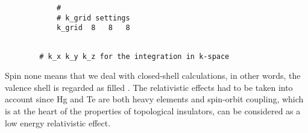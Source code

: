 	\begin{minipage}[c]{0.3\linewidth}\vspace{0.2cm}
		\begin{verbatim}
			#
			# k_grid settings
			k_grid	8	8	8
		\end{verbatim}\vspace{8pt}
	\end{minipage}
	\hfill 
	\begin{minipage}[c]{0.7\linewidth}\vspace{28pt}
		\begin{verbatim}
		
		# k_x k_y k_z for the integration in k-space
		\end{verbatim}\vspace{8pt}
	\end{minipage} 

	Spin none means that we deal with closed-shell calculations, in other words, the valence shell is regarded as filled \cite{closed_shell}. 
	The relativistic effects had to be taken into account since Hg and Te are both heavy elements and spin-orbit coupling, which is at the heart of the properties of topological insulators, can be considered as a low energy relativistic effect.
	
